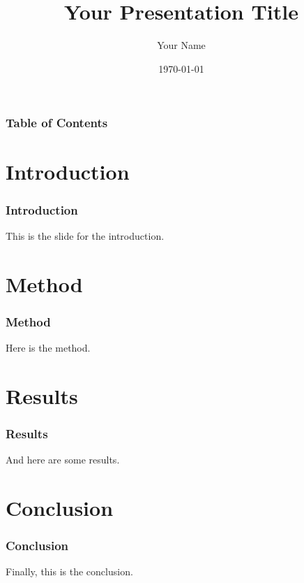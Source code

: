 \documentclass{beamer}
\title{Your Presentation Title}
\author{Your Name}
\institute{Your Institute or Affiliation}
\date{\today}
\begin{document}
\begin{frame}
\titlepage
\end{frame}

\begin{frame}
\frametitle{Table of Contents}
\tableofcontents
\end{frame}

\section{Introduction}

\begin{frame}
\frametitle{Introduction}
This is the slide for the introduction.
\end{frame}

\section{Method}

\begin{frame}
\frametitle{Method}
Here is the method.
\end{frame}

\section{Results}

\begin{frame}
\frametitle{Results}
And here are some results.
\end{frame}

\section{Conclusion}

\begin{frame}
\frametitle{Conclusion}
Finally, this is the conclusion.
\end{frame}
\end{document}

